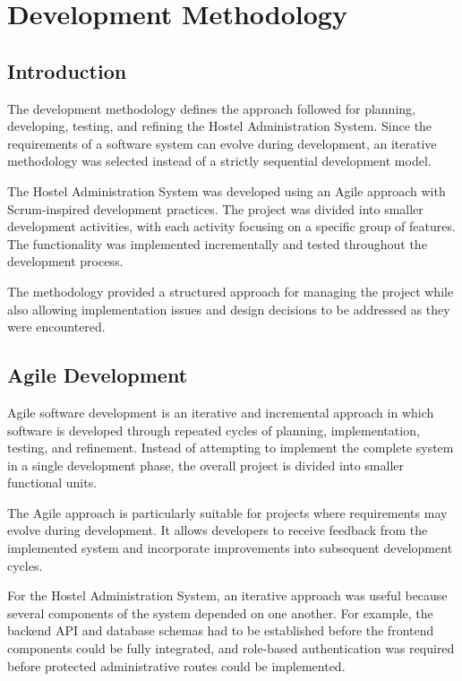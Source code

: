 \chapter{Development Methodology}

\section{Introduction}

The development methodology defines the approach followed for planning, developing, testing, and refining the Hostel Administration System. Since the requirements of a software system can evolve during development, an iterative methodology was selected instead of a strictly sequential development model.

The Hostel Administration System was developed using an Agile approach with Scrum-inspired development practices. The project was divided into smaller development activities, with each activity focusing on a specific group of features. The functionality was implemented incrementally and tested throughout the development process.

The methodology provided a structured approach for managing the project while also allowing implementation issues and design decisions to be addressed as they were encountered.

\section{Agile Development}

Agile software development is an iterative and incremental approach in which software is developed through repeated cycles of planning, implementation, testing, and refinement. Instead of attempting to implement the complete system in a single development phase, the overall project is divided into smaller functional units.

The Agile approach is particularly suitable for projects where requirements may evolve during development. It allows developers to receive feedback from the implemented system and incorporate improvements into subsequent development cycles.

For the Hostel Administration System, an iterative approach was useful because several components of the system depended on one another. For example, the backend API and database schemas had to be established before the frontend components could be fully integrated, and role-based authentication was required before protected administrative routes could be implemented.

